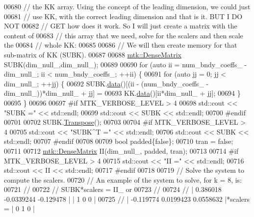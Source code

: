 \begin{DoxyCode}
{{00680   \textcolor{comment}{// the KK array. Using the concept of the leading dimension, we could just}
00681   \textcolor{comment}{// use KK, with the correct leading dimension and that is it. BUT I DO NOT}
00682   \textcolor{comment}{// GET how does it work. So I will just create a matrix with the content of}
00683   \textcolor{comment}{// this array that we need, solve for the scalers and then scale the}
00684   \textcolor{comment}{// whole KK:}
00685 
00686   \textcolor{comment}{// We will then create memory for that sub-matrix of KK (SUBK).}
00687 
00688   \hyperlink{classmtk_1_1DenseMatrix}{mtk::DenseMatrix} SUBK(dim\_null\_,dim\_null\_);
00689 
00690   \textcolor{keywordflow}{for} (\textcolor{keyword}{auto} ii = num\_bndy\_coeffs\_ - dim\_null\_; ii < num\_bndy\_coeffs\_; ++ii) \{
00691     \textcolor{keywordflow}{for} (\textcolor{keyword}{auto} jj = 0; jj < dim\_null\_; ++jj) \{
00692       SUBK.\hyperlink{classmtk_1_1DenseMatrix_a0c33b8a9e01d157c61ddbdf807c25d84}{data}()[(ii - (num\_bndy\_coeffs\_ - dim\_null\_))*dim\_null\_ + jj] =
00693           KK.\hyperlink{classmtk_1_1DenseMatrix_a0c33b8a9e01d157c61ddbdf807c25d84}{data}()[ii*dim\_null\_ + jj];
00694     \}
00695   \}
00696 
00697 \textcolor{preprocessor}{  #if MTK\_VERBOSE\_LEVEL > 4}
00698   std::cout << \textcolor{stringliteral}{"SUBK ="} << std::endl;
00699   std::cout << SUBK << std::endl;
00700 \textcolor{preprocessor}{  #endif}
00701 
00702   SUBK.\hyperlink{classmtk_1_1DenseMatrix_a71d9c07ca66e88d97d1fd5012f43138b}{Transpose}();
00703 
00704 \textcolor{preprocessor}{  #if MTK\_VERBOSE\_LEVEL > 4}
00705   std::cout << \textcolor{stringliteral}{"SUBK^T ="} << std::endl;
00706   std::cout << SUBK << std::endl;
00707 \textcolor{preprocessor}{  #endif}
00708 
00709   \textcolor{keywordtype}{bool} padded\{\textcolor{keyword}{false}\};
00710   tran = \textcolor{keyword}{false};
00711 
00712   \hyperlink{classmtk_1_1DenseMatrix}{mtk::DenseMatrix} II(dim\_null\_, padded, tran);
00713 
00714 \textcolor{preprocessor}{  #if MTK\_VERBOSE\_LEVEL > 4}
00715   std::cout << \textcolor{stringliteral}{"II ="} << std::endl;
00716   std::cout << II << std::endl;
00717 \textcolor{preprocessor}{  #endif}
00718 
00719   \textcolor{comment}{// Solve the system to compute the scalers.}
00720   \textcolor{comment}{// An example of the system to solve, for k = 8, is:}
00721   \textcolor{comment}{//}
00722   \textcolor{comment}{// SUBK*scalers = II\_ or}
00723   \textcolor{comment}{//}
00724   \textcolor{comment}{// |  0.386018  -0.0339244   -0.129478 |           | 1 0 0 |}
00725   \textcolor{comment}{// | -0.119774   0.0199423   0.0558632 |*scalers = | 0 1 0 |}
}}
\end{DoxyCode}
